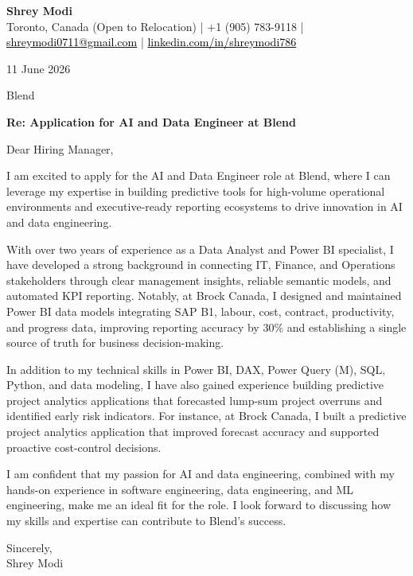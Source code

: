 \documentclass[11pt,letterpaper]{article}
\begin{document}
\begin{center}
  {\Large \bfseries \color{accent} Shrey Modi}\\[0.2em]
  {\small Toronto, Canada (Open to Relocation) | +1 (905) 783-9118 | \href{mailto:shreymodi0711@gmail.com}{\textcolor{black}{shreymodi0711@gmail.com}} | \href{https://linkedin.com/in/shreymodi786}{\textcolor{black}{linkedin.com/in/shreymodi786}}}
\end{center}

\vspace{1em}

11 June 2026

\vspace{0.5em}

Blend\\
\vspace{0.5em}

\textbf{Re: Application for AI and Data Engineer at Blend}

Dear Hiring Manager,

I am excited to apply for the AI and Data Engineer role at Blend, where I can leverage my expertise in building predictive tools for high-volume operational environments and executive-ready reporting ecosystems to drive innovation in AI and data engineering.

With over two years of experience as a Data Analyst and Power BI specialist, I have developed a strong background in connecting IT, Finance, and Operations stakeholders through clear management insights, reliable semantic models, and automated KPI reporting. Notably, at Brock Canada, I designed and maintained Power BI data models integrating SAP B1, labour, cost, contract, productivity, and progress data, improving reporting accuracy by 30\% and establishing a single source of truth for business decision-making.

In addition to my technical skills in Power BI, DAX, Power Query (M), SQL, Python, and data modeling, I have also gained experience building predictive project analytics applications that forecasted lump-sum project overruns and identified early risk indicators. For instance, at Brock Canada, I built a predictive project analytics application that improved forecast accuracy and supported proactive cost-control decisions.

I am confident that my passion for AI and data engineering, combined with my hands-on experience in software engineering, data engineering, and ML engineering, make me an ideal fit for the role. I look forward to discussing how my skills and expertise can contribute to Blend's success.

Sincerely,\\
Shrey Modi
\end{document}
